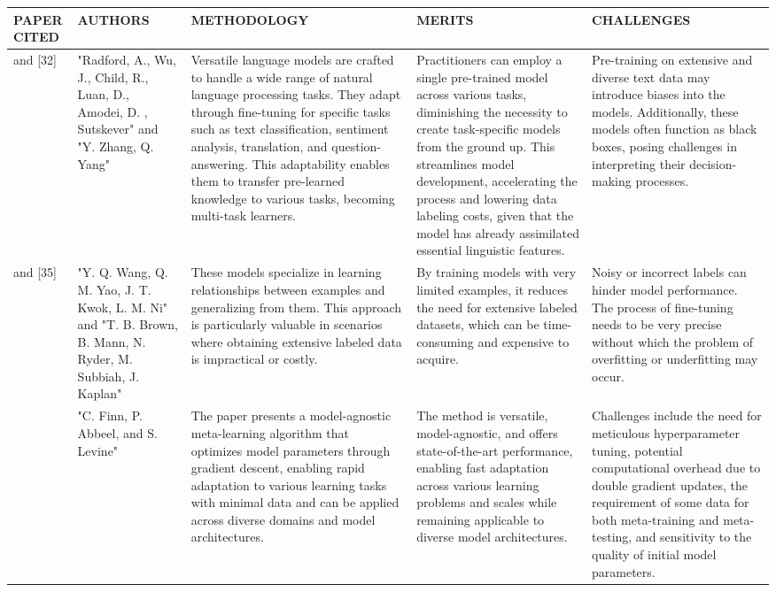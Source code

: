 \documentclass[fleqn,10pt]{thescipub} %
\begin{document}
\begin{table}
\begin{center}
 \centering
  \small %
    \begin{tabular}{ |p{1cm}|p{2cm}|p{4cm}|p{4cm}|p{4cm}| }
\hline
\centering PAPER CITED & \centering  AUTHORS & \centering METHODOLOGY &  \centering MERITS &  \centering CHALLENGES \arraybackslash \\ 
\hline
[31] and [32] & "Radford, A., Wu, J., Child, R., Luan, D., Amodei, D. , Sutskever" and "Y. Zhang, Q. Yang" & Versatile language models are crafted to handle a wide range of natural language processing tasks. They adapt through fine-tuning for specific tasks such as text classification, sentiment analysis, translation, and question-answering. This adaptability enables them to transfer pre-learned knowledge to various tasks, becoming multi-task learners. & Practitioners can employ a single pre-trained model across various tasks, diminishing the necessity to create task-specific models from the ground up. This streamlines model development, accelerating the process and lowering data labeling costs, given that the model has already assimilated essential linguistic features. & Pre-training on extensive and diverse text data may introduce biases into the models. Additionally, these models often function as black boxes, posing challenges in interpreting their decision-making processes. \\
\hline
[33] and [35]  & "Y. Q. Wang, Q. M. Yao, J. T. Kwok, L. M. Ni" and "T. B. Brown, B. Mann, N. Ryder, M. Subbiah, J. Kaplan" & These models specialize in learning relationships between examples and generalizing from them. This approach is particularly valuable in scenarios where obtaining extensive labeled data is impractical or costly. & By training models with very limited examples, it reduces the need for extensive labeled datasets, which can be time-consuming and expensive to acquire. & Noisy or incorrect labels can hinder model performance. The process of fine-tuning needs to be very precise without which the problem of overfitting or underfitting may occur. \\
\hline
[36]  & "C. Finn, P. Abbeel, and S. Levine" & The paper presents a model-agnostic meta-learning algorithm that optimizes model parameters through gradient descent, enabling rapid adaptation to various learning tasks with minimal data and can be applied across diverse domains and model architectures. & The method is versatile, model-agnostic, and offers state-of-the-art performance, enabling fast adaptation across various learning problems and scales while remaining applicable to diverse model architectures. & Challenges include the need for meticulous hyperparameter tuning, potential computational overhead due to double gradient updates, the requirement of some data for both meta-training and meta-testing, and sensitivity to the quality of initial model parameters. \\

\end{tabular}
\end{center}
\end{table}
\end{document}

